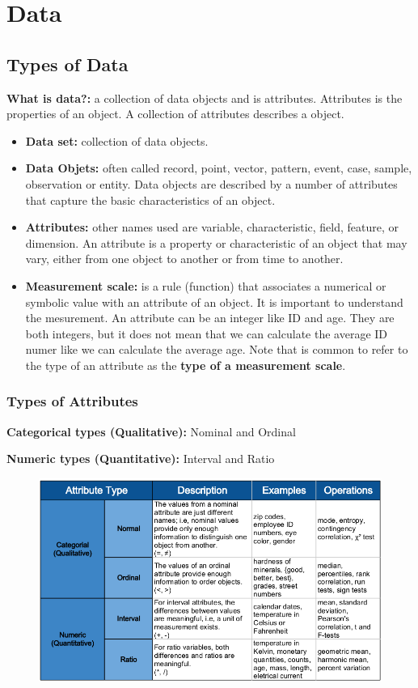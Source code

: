 \chapter{Data}
\clearpage

\section{Types of Data}
	{\bf What is data?:} a collection of data objects and is attributes. Attributes
	is the properties of an object. A collection of attributes describes a object. 

	\begin{itemize}
		\item {\bf Data set: } collection of data objects.
		\item {\bf Data Objets: } often called record, point, vector, pattern, event, case,
		sample, observation or entity. Data objects are described by a number of attributes
		that capture the basic characteristics of an object.
		\item {\bf Attributes: } other names used are variable, characteristic, field, feature, 
		or dimension. An attribute is a property or characteristic of an object that may
		vary, either from one object to another or from time to another.
		\item {\bf Measurement scale: } is a rule (function) that associates a numerical or
		symbolic value with an attribute of an object. It is important to understand the 
		mesurement. An attribute can be an integer like ID and age. They are both integers, 
		but it does not mean that we can calculate the average ID numer like we can calculate
		the average age. Note that is common to refer to the type of an attribute as the
		{\bf type of a measurement scale}.
	\end{itemize}

	\subsection{Types of Attributes}
	{\bf Categorical types (Qualitative):} Nominal and Ordinal

	{\bf Numeric types (Quantitative):} Interval and Ratio

		\begin{figure}[H]
			\includegraphics[width=\textwidth]{pics/typeOfAttributes.png}
		\end{figure}

